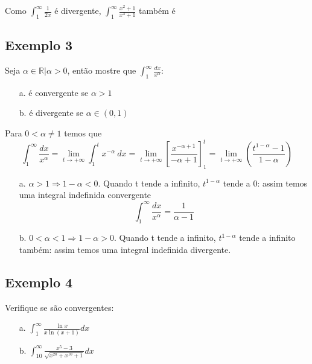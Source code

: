 \documentclass[12pt,openany]{book}
\begin{document}
Como $ \displaystyle{\int_1^{\infty} \frac{1}{2x}} $ é divergente, $\displaystyle{ \int_1^{\infty} \frac{x^2+1}{x^3+1}} $ também é

\subsection{Exemplo 3}
\label{sub:ex243}

\hspace{5mm}Seja $\alpha \in \mathds{R} | \alpha >0 $, então mostre que $\displaystyle{\int_1^\infty \frac{dx}{x^\alpha}} $:
\begin{enumerate}
\item [a.] é convergente se $\alpha > 1$\\
\item [b.] é divergente se $\alpha \in (0,1) $
\end{enumerate}

Para $0  < \alpha \neq 1$ temos que $$\displaystyle{\int_1^\infty \frac{dx}{x^\alpha} = \lim_{t \rightarrow +\infty} \int_1^t x^{-\alpha}\ dx = \lim_{t \rightarrow +\infty} \left[ \frac{x^{-\alpha + 1}}{-\alpha + 1}\right]_1^t = \lim_{t \rightarrow +\infty} \left( \frac{t^{1-\alpha}-1}{1-\alpha}\right)}$$

\begin{enumerate}
\item [a.] $\alpha > 1 \Rightarrow 1 - \alpha < 0$. Quando t tende a infinito, $t^{1-\alpha}$ tende a 0: assim temos uma integral indefinida convergente $$\displaystyle{\int_1^\infty \frac{dx}{x^\alpha}} = \frac{1}{\alpha - 1}$$
\item [b.] $0 < \alpha < 1 \Rightarrow 1 - \alpha > 0$. Quando t tende a infinito, $t^{1-\alpha}$ tende a infinito também: assim temos uma integral indefinida divergente.
\end{enumerate}

\subsection{Exemplo 4}
\label{sub:ex244}

\hspace{5mm} Verifique se são convergentes:
\begin{enumerate}
\item [a.] $\displaystyle{\int_1^{\infty} \frac{\ln x}{x \ln \left(x+1\right)} dx}$
\item [b.] $\displaystyle{\int_{10}^{\infty}\frac{x^5-3}{\sqrt{x^{20}+x^{10}+1}} dx}$
\end{enumerate}
\end{document}
